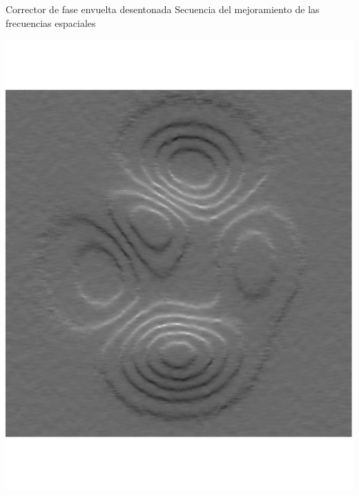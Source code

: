 \documentclass[]{beamer}
\begin{document}
\begin{frame}{Corrector de fase envuelta desentonada}
Secuencia del mejoramiento de las frecuencias espaciales
\begin{center}

\includegraphics[scale=0.15]{Images/Fig_frecuencias1.pdf} \quad

\end{center}
\end{frame}
\end{document}
